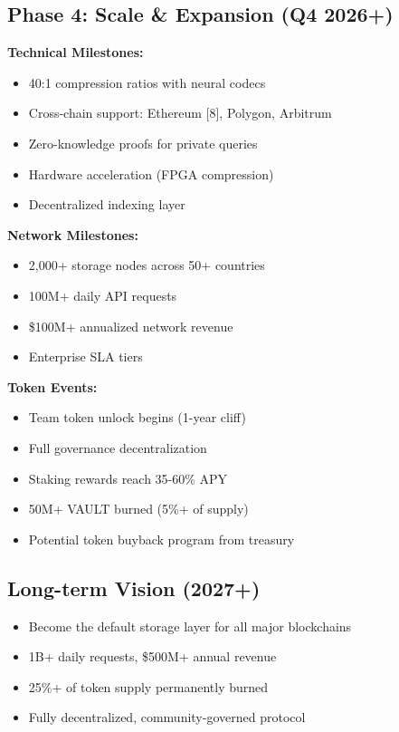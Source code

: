 \documentclass[12pt,a4paper]{article}
\begin{document}
\subsection{Phase 4: Scale \& Expansion (Q4 2026+)}

\textbf{Technical Milestones:}
\begin{itemize}
    \item 40:1 compression ratios with neural codecs
    \item Cross-chain support: Ethereum [8], Polygon, Arbitrum
    \item Zero-knowledge proofs for private queries
    \item Hardware acceleration (FPGA compression)
    \item Decentralized indexing layer
\end{itemize}

\textbf{Network Milestones:}
\begin{itemize}
    \item 2,000+ storage nodes across 50+ countries
    \item 100M+ daily API requests
    \item \$100M+ annualized network revenue
    \item Enterprise SLA tiers
\end{itemize}

\textbf{Token Events:}
\begin{itemize}
    \item Team token unlock begins (1-year cliff)
    \item Full governance decentralization
    \item Staking rewards reach 35-60\% APY
    \item 50M+ VAULT burned (5\%+ of supply)
    \item Potential token buyback program from treasury
\end{itemize}

\subsection{Long-term Vision (2027+)}

\begin{itemize}
    \item Become the default storage layer for all major blockchains
    \item 1B+ daily requests, \$500M+ annual revenue
    \item 25\%+ of token supply permanently burned
    \item Fully decentralized, community-governed protocol
\end{itemize}
\end{document}
